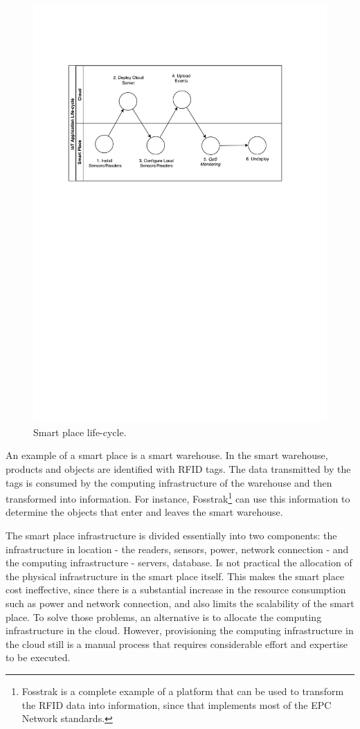 \begin{figure}
  \centering
  \includegraphics[width=\textwidth]{images/life-cycle.pdf}
  \caption{Smart place life-cycle.}
  \label{fig:smartplace_lifecycle}
\end{figure}

An example of a smart place is a smart warehouse. In the smart warehouse, products and objects
are identified with RFID tags. The data transmitted by the tags is consumed by the computing
infrastructure of the warehouse and then transformed into information. For instance,
Fosstrak\footnote{Fosstrak is a complete example of a platform that can be used to transform
the RFID data into information, since that implements most of the EPC Network standards.} can use
this information to determine the objects that enter and leaves the smart warehouse.

The smart place infrastructure is divided essentially into two components: the infrastructure in location -
the readers, sensors, power, network connection - and the computing infrastructure - servers, database.
Is not practical the allocation of the physical infrastructure in the smart place itself. This makes the smart place
cost ineffective, since there is a substantial increase in the resource consumption such as power and network
connection, and also limits the scalability of the smart place. To solve those problems, an alternative is to
allocate the computing infrastructure in the cloud. However, provisioning the computing infrastructure in
the cloud still is a manual process that requires considerable effort and expertise
to be executed.

